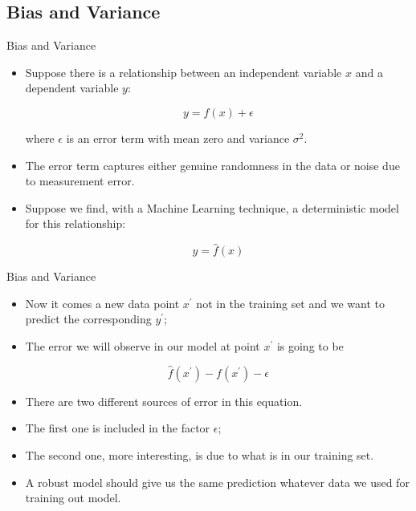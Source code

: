 \documentclass[11pt]{beamer}
\begin{document}
\subsection[subsection]{Bias and Variance}
%
\begin{frame}{Bias and Variance}
\begin{itemize}
\item Suppose there is a relationship between an independent variable $x$ and a dependent variable $y$:

\begin{equation}
    y=f(x) + \epsilon
\end{equation}

where $\epsilon$ is an error term with mean zero and variance $\sigma^2$. 

\item The error term captures either genuine randomness in the data or noise due to measurement error.

\item Suppose we find, with a Machine Learning technique,  a deterministic model for this relationship:

\begin{equation}
    y = \hat f(x)
\end{equation}
 
\end{itemize}
\end{frame}
\begin{frame}{Bias and Variance}
\begin{itemize}
\item Now it comes a new data point $x^\prime$ not in the training set and we want to predict the corresponding $y^\prime$;

\item The error we will observe in our model at point $x^\prime$ is going to be

\begin{equation}
    \hat f(x^\prime) - f(x^\prime) - \epsilon
\end{equation}

\item There are two different sources of error in this equation. 

\item The first one is included in the factor $\epsilon$; 

\item The second one, more interesting, is due to what is in our training set. 

\item A robust model should give us the same prediction whatever data we used for training out model.
\end{itemize}
\end{frame}
\end{document}
